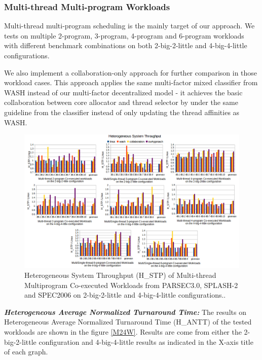 \documentclass[sigplan,review,anonymous]{acmart}\settopmatter{printfolios=true,printccs=false,printacmref=false}
\begin{document}
\subsubsection{Multi-thread Multi-program Workloads}
Multi-thread multi-program scheduling is the mainly target of our approach. We tests on multiple 2-program, 3-program, 4-program and 6-program workloads with different benchmark combinations on both 2-big-2-little and 4-big-4-little configurations. 

We also implement a collaboration-only approach for further comparison in those workload cases. This approach applies the same multi-factor mixed classifier from WASH instead of our multi-factor decentralized model - it achieves the basic collaboration between core allocator and thread selector by under the same guideline from the classifier instead of only updating the thread affinities as WASH.

\begin{figure}
\centering
\includegraphics[scale=0.5]{figures/HSTP.png}
\caption{Heterogeneous System Throughput (H\_STP)  of Multi-thread Multiprogram Co-executed Workloads from PARSEC3.0, SPLASH-2 and SPEC2006 on 2-big-2-little and 4-big-4-little configurations..}
\label{M36W}
\end{figure} 
\textbf{\textit{Heterogeneous Average Normalized Turnaround Time:}}
The results on Heterogeneous Average Normalized Turnaround Time (H\_ANTT) of the tested workloads are shown in the figure \ref{M24W}.  Results are come from either the 2-big-2-little configuration and 4-big-4-little results as indicated in the X-axis title of each graph. 
\end{document}
